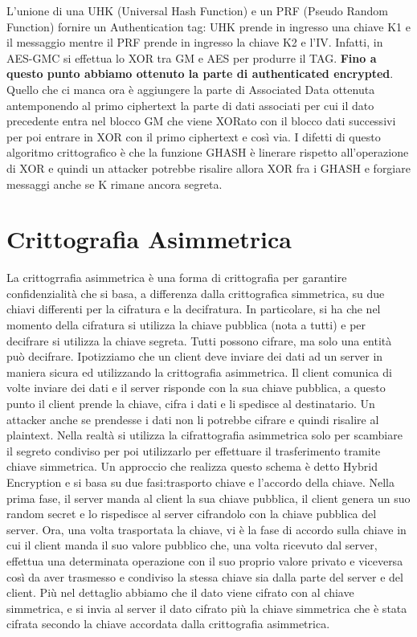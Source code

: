\documentclass{article}
\begin{document}
L'unione di una UHK (Universal Hash Function) e un PRF (Pseudo Random Function) fornire un Authentication tag: UHK prende in ingresso una chiave K1 e il messaggio mentre il PRF prende in ingresso la chiave K2 e l'IV\@.\newline
Infatti, in AES-GMC si effettua lo XOR tra GM e AES per produrre il TAG\@.\newline
\textbf{Fino a questo punto abbiamo ottenuto la parte di authenticated encrypted}.\newline
Quello che ci manca ora è aggiungere la parte di Associated Data ottenuta antemponendo al primo ciphertext la parte di dati associati per cui il dato precedente entra nel blocco GM che viene XORato con il blocco dati successivi per poi entrare in XOR con il primo ciphertext e così via\@.\newline
I difetti di questo algoritmo crittografico è che la funzione GHASH è linerare rispetto all'operazione di XOR e quindi un attacker potrebbe risalire allora XOR fra i GHASH e forgiare messaggi anche se K rimane ancora segreta\@.
\section{Crittografia Asimmetrica}
La crittogrrafia asimmetrica è una forma di crittografia per garantire confidenzialità che si basa, a differenza dalla crittografica simmetrica, su due chiavi differenti per la cifratura e la decifratura\@. In particolare, si ha che nel momento della cifratura si utilizza la chiave pubblica (nota a tutti) e per decifrare si utilizza la chiave segreta\@.\newline
Tutti possono cifrare, ma solo una entità può decifrare\@. Ipotizziamo che un client deve inviare dei dati ad un server in maniera sicura ed utilizzando la crittografia asimmetrica\@. Il client comunica di volte inviare dei dati e il server risponde con la sua chiave pubblica, a questo punto il client prende la chiave, cifra i dati e li spedisce al destinatario\@.
Un attacker anche se prendesse i dati non li potrebbe cifrare e quindi risalire al plaintext\@.\newline
Nella realtà si utilizza la cifrattografia asimmetrica solo per scambiare il segreto condiviso per poi utilizzarlo per effettuare il trasferimento tramite chiave simmetrica\@.
Un approccio che realizza questo schema è detto Hybrid Encryption e si basa su due fasi:\@il trasporto chiave e l'accordo della chiave\@. Nella prima fase, il server manda al client la sua chiave pubblica, il client genera un suo random secret e lo rispedisce al server cifrandolo con la chiave pubblica del server\@. Ora, una volta trasportata la chiave, vi è la fase di accordo sulla chiave in cui il client manda il suo valore pubblico che, una volta ricevuto dal server, effettua una determinata operazione con il suo proprio valore privato e viceversa così da aver trasmesso e condiviso la stessa chiave sia dalla parte del server e del client. Più nel dettaglio abbiamo che il dato viene cifrato con al chiave simmetrica, e si invia al server il dato cifrato più la chiave simmetrica che è stata cifrata secondo la chiave accordata dalla crittografia asimmetrica.
\end{document}
